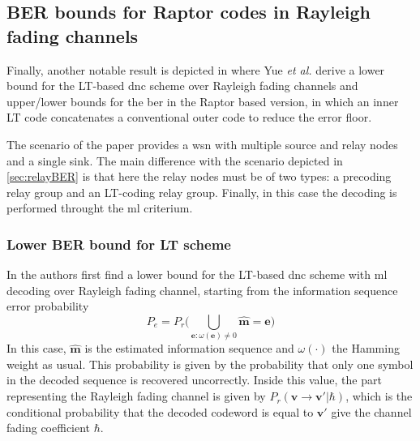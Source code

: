 \subsection{BER bounds for Raptor codes in Rayleigh fading channels}
Finally, another notable result is depicted in \cite{Yue2013} where Yue \textit{et al.} derive a lower bound for the LT-based \gls{dnc} scheme over Rayleigh fading channels and upper/lower bounds for the \gls{ber} in the Raptor based version, in which an inner LT code concatenates a conventional outer code to reduce the error floor.

The scenario of the paper provides a \gls{wsn} with multiple source and relay nodes and a single sink. The main difference with the scenario depicted in \autoref{sec:relayBER} is that here the relay nodes must be of two types: a precoding relay group and an LT-coding relay group. Finally, in this case the decoding is performed throught the \gls{ml} criterium.

\subsubsection{Lower BER bound for LT scheme}
In \cite{Yue2013} the authors first find a lower bound for the LT-based \gls{dnc} scheme with \gls{ml} decoding over Rayleigh fading channel, starting from the information sequence error probability
\begin{equation}
  P_e = P_r\biggl(\bigcup\limits_{\mathbf{e}:\omega(\mathbf{e})\neq 0}\hat{\mathbf{m} }= \mathbf{e}\biggr)
\end{equation}
In this case, $\hat{\mathbf{m}}$ is the estimated information sequence and $\omega(\cdot)$ the Hamming weight as usual. This probability is given by the probability that only one symbol in the decoded sequence is recovered uncorrectly. Inside this value, the part representing the Rayleigh fading channel is given by $P_r(\mathbf{v}\rightarrow \mathbf{v}'|\hbar)$, which is the conditional probability that the decoded codeword is equal to $\mathbf{v}'$ give the channel fading coefficient $\hbar$.

